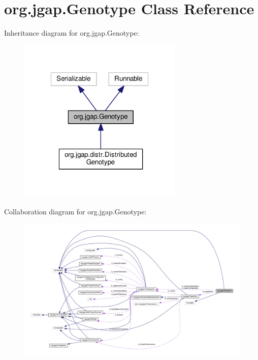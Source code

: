 \hypertarget{classorg_1_1jgap_1_1_genotype}{\section{org.\-jgap.\-Genotype Class Reference}
\label{classorg_1_1jgap_1_1_genotype}
}


Inheritance diagram for org.\-jgap.\-Genotype\-:
\nopagebreak
\begin{figure}[H]
\begin{center}
\leavevmode
\includegraphics[width=222pt]{classorg_1_1jgap_1_1_genotype__inherit__graph}
\end{center}
\end{figure}


Collaboration diagram for org.\-jgap.\-Genotype\-:
\nopagebreak
\begin{figure}[H]
\begin{center}
\leavevmode
\includegraphics[width=350pt]{classorg_1_1jgap_1_1_genotype__coll__graph}
\end{center}
\end{figure}
